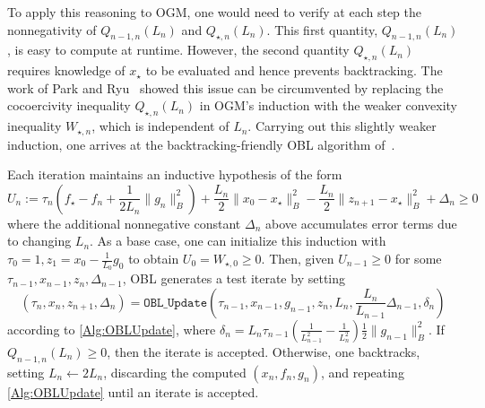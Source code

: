 \documentclass[11pt]{article}
\numberwithin{equation}{section}
\newcommand{\normB}[1]{\|{#1}\|_B}
\theoremstyle{definition}
\theoremstyle{plain}
\theoremstyle{definition}
\begin{document}
To apply this reasoning to OGM, one would need to verify at each step the nonnegativity of $Q_{n-1,n}(L_n)$ and $Q_{\star, n}(L_n)$. This first quantity, $Q_{n-1,n}(L_n)$, is easy to compute at runtime. However, the second quantity $Q_{\star, n}(L_n)$ requires knowledge of $x_\star$ to be evaluated and hence prevents backtracking. The work of Park and Ryu~\cite{OBL} showed this issue can be circumvented by replacing the cocoercivity inequality $Q_{\star, n}(L_n)$ in OGM's induction with the weaker convexity inequality $W_{\star,n}$, which is independent of $L_n$. Carrying out this slightly weaker induction, one arrives at the backtracking-friendly OBL algorithm of~\cite{OBL}.

Each iteration maintains an inductive hypothesis of the form
\begin{equation} \label{Eqn:Def_U}
U_n := \tau_n \left(f_\star - f_n + \frac{1}{2L_n}\normB{g_n}^2\right) + \frac{L_n}{2}\normB{x_0-x_\star}^2 - \frac{L_n}{2}\normB{z_{n+1}-x_\star}^2 +\Delta_n \geq 0
\end{equation}
where the additional nonnegative constant $\Delta_n$ above accumulates error terms due to changing $L_n$. 
As a base case, one can initialize this induction with $\tau_0 = 1, z_1 = x_0 - \frac{1}{L_0} g_0$ to obtain $U_0 = W_{\star,0} \geq 0$.
Then, given $U_{n-1}\geq 0$ for some $\tau_{n-1},x_{n-1},z_n, \Delta_{n-1}$, OBL generates a test iterate by setting
\begin{equation} \label{Eqn:StandardOBLUpdate}
    (\tau_n, x_n, z_{n+1}, \Delta_n) = \texttt{OBL\_Update}(\tau_{n-1}, x_{n-1}, g_{n-1}, z_n, L_n, \frac{L_n}{L_{n-1}} \Delta_{n-1}, \delta_n)
\end{equation}
according to \cref{Alg:OBLUpdate}, where $\delta_n = L_n \tau_{n-1}\left(\frac{1}{L_{n-1}^2} - \frac{1}{L_n^2}\right) \frac{1}{2}\normB{g_{n-1}}^2$. If $Q_{n-1,n}(L_n) \geq 0$, then the iterate is accepted. Otherwise, one backtracks, setting $L_n \leftarrow 2 L_n$, discarding the computed $(x_n,f_n,g_n)$, and repeating \cref{Alg:OBLUpdate} until an iterate is accepted.
\end{document}
